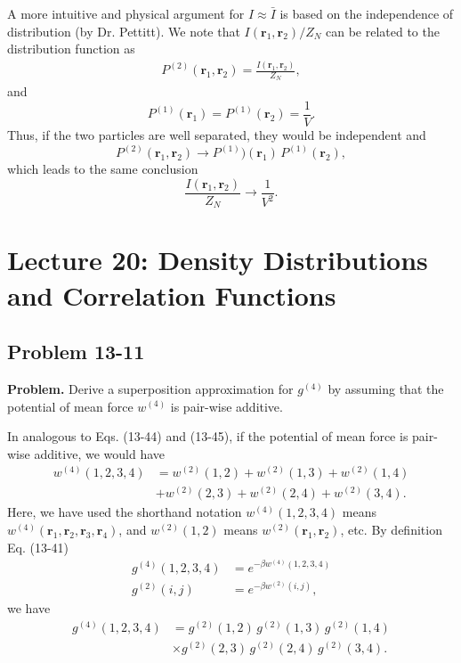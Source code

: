 \documentclass[twocolumn, 10pt]{article}
\numberwithin{equation}{section}
\newenvironment{problem}
{\par\medskip \color{problue}
  \textbf{Problem. }\ignorespaces}
{\medskip}
\newenvironment{solution}[1][\empty]
{\par\medskip\sffamily
  \textbf{\ifx\empty#1{Solution.}\relax\else{#1}\fi} \ignorespaces}
{\medskip}
\begin{document}
\begin{solution}
  A more intuitive and physical argument for $I \approx \bar I$
  is based on the independence of distribution
  (by Dr. Pettitt).
  We note that $I(\mathbf r_1, \mathbf r_2)/Z_N$ can be related to the distribution function
  as
  \begin{align*}
    P^{(2)}(\mathbf r_1, \mathbf r_2) = \frac{ I(\mathbf r_1, \mathbf r_2) } { Z_N },
  \end{align*}
  and
  $$
  P^{(1)}(\mathbf r_1) = P^{(1)}(\mathbf r_2) = \frac{1}{V}.
  $$
  Thus, if the two particles are well separated,
  they would be independent and
  $$
  P^{(2)}(\mathbf r_1, \mathbf r_2) \to P^{(1)})(\mathbf r_1) \, P^{(1)}(\mathbf r_2),
  $$
  which leads to the same conclusion
  $$
  \frac{I(\mathbf r_1, \mathbf r_2) }{Z_N} \to \frac{1}{V^2}.
  $$
\end{solution}



\section{Lecture 20: Density Distributions and Correlation Functions}

\subsection{Problem 13-11}

\begin{problem}
  Derive a superposition approximation for $g^{(4)}$
  by assuming that the potential of mean force $w^{(4)}$
  is pair-wise additive.
\end{problem}

\begin{solution}
  In analogous to Eqs. (13-44) and (13-45),
  if the potential of mean force is pair-wise additive,
  we would have
  \begin{align*}
    w^{(4)}(1,2,3,4)
    &=
    w^{(2)}(1,2)
    +w^{(2)}(1,3)
    +w^{(2)}(1,4)
    \\
    &+w^{(2)}(2,3)
    +w^{(2)}(2,4)
    +w^{(2)}(3,4)
    .
  \end{align*}
  Here, we have used the shorthand notation
  $w^{(4)}(1, 2, 3, 4)$
  means
  $w^{(4)}(\mathbf r_1, \mathbf r_2, \mathbf r_3, \mathbf r_4)$,
  and
  $w^{(2)}(1, 2)$
  means
  $w^{(2)}(\mathbf r_1, \mathbf r_2)$,
  etc.
  By definition Eq. (13-41)
  \begin{align*}
    g^{(4)}(1, 2, 3, 4)
    &=
    e^{-\beta w^{(4)}(1, 2, 3, 4)}
    \\
    g^{(2)}(i, j)
    &=
    e^{-\beta w^{(2)}(i, j)}
    ,
  \end{align*}
  we have
  \begin{align*}
    g^{(4)}(1,2,3,4)
    &=
    g^{(2)}(1,2) \,
    g^{(2)}(1,3) \,
    g^{(2)}(1,4)
    \\
    &\times
    g^{(2)}(2,3) \,
    g^{(2)}(2,4) \,
    g^{(2)}(3,4)
    .
  \end{align*}
\end{solution}
\end{document}

